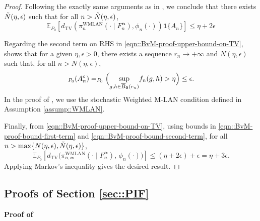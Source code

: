 \documentclass[11pt, oneside]{amsart}
\theoremstyle{definition}   %
\let\P\relax
\newcommand{\P}{\mathbb{P}}
\newcommand{\E}{\mathbb{E}}
\newcommand{\wempirical}{F_n^{\boldsymbol{\alpha}}}
\begin{document}
\begin{proof}
    Following the exactly same arguments as in \cite{avellamedinaetal2021}, we conclude that there exists $\Tilde{N}(\eta, \epsilon)$ such that for all $n > \Tilde{N}(\eta, \epsilon)$,
    \begin{equation}
    \label{eqn::BvM-proof-bound-first-term}
        \E_{P_0} [ d_{\mathrm{TV}} (\pi^{\mathrm{WMLAN}}_{n}(\cdot \mid \wempirical), \phi_n(\cdot) ) \mathbf{1} \{ A_n \} ] \leq \eta + 2 \epsilon
    \end{equation}
    
    Regarding the second term on RHS in \eqref{eqn::BvM-proof-upper-bound-on-TV},  shows that for a given $\eta, \epsilon > 0$, there exists a sequence $r_n \rightarrow + \infty$ and $N(\eta, \epsilon)$ such that, for all $n > N(\eta, \epsilon)$, 
    \begin{equation}
    \label{eqn::BvM-proof-bound-second-term}
        \P_{P_0} (A_n^c) = \P_{P_0} \Big ( \underset{g,h \in \overline{B}_{\textbf{0}}(r_n) }{\sup} f_n(g, h) > \eta \Big) \leq \epsilon.
    \end{equation}
    In the proof of , we use the stochastic Weighted M-LAN condition defined in Assumption \ref{assump::WMLAN}.
    
    Finally, from \eqref{eqn::BvM-proof-upper-bound-on-TV}, using bounds in \eqref{eqn::BvM-proof-bound-first-term} and \eqref{eqn::BvM-proof-bound-second-term}, for all $n > \max \{ N(\eta, \epsilon), \Tilde{N}(\eta, \epsilon) \}$,
    \begin{equation}
    \label{eqn::last-line-of-BvM-theorem}
    \E_{P_0} \left [ d_{\mathrm{TV}} \bigl (\pi^{\mathrm{WMLAN}}_{n,\boldsymbol{\alpha}}(\cdot \mid  \wempirical), \, \phi_n(\cdot) \bigr ) \right ] \leq (\eta + 2 \epsilon) + \epsilon = \eta + 3 \epsilon.
    \end{equation}
    Applying Markov's inequality gives the desired result.
\end{proof} 
%
%
\subsection{Proofs of Section \ref{sec::PIF}}
\noindent \textbf{Proof of }
\end{document}
